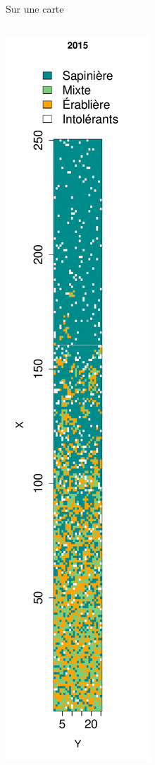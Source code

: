 \documentclass{eecslides}
\begin{document}
	\begin{frame}{Sur une carte}
		\begin{columns}
			\begin{column}{0.25\textwidth}
				\begin{center}
					\includegraphics[height=0.8\textheight]{largeplot_2015}

\end{center}
\end{column}
\end{columns}
\end{frame}
\end{document}
